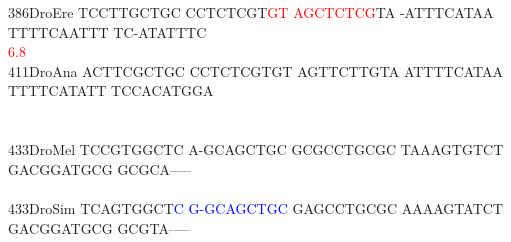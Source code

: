 \documentclass[11pt,twoside,reqno,a4paper]{article}
\begin{document}
{386\hspace*{1\charwidth}DroEre	TCCTTGCTGC	CCTCTCGT\textcolor{Red}{G}\textcolor{Red}{T}	\textcolor{Red}{A}\textcolor{Red}{G}\textcolor{Red}{C}\textcolor{Red}{T}\textcolor{Red}{C}\textcolor{Red}{T}\textcolor{Red}{C}\textcolor{Red}{G}TA	-ATTTCATAA	TTTTCAATTT	TC-ATATTTC	\\
\hspace*{4\charwidth}\hspace*{7\charwidth}\hspace*{1\charwidth}\hspace*{18\charwidth}\textcolor{Red}{6.8}\hspace*{1\charwidth}\hspace*{1\charwidth}\hspace*{1\charwidth}\hspace*{1\charwidth}\hspace*{1\charwidth}\\
411\hspace*{1\charwidth}DroAna	ACTTCGCTGC	CCTCTCGTGT	AGTTCTTGTA	ATTTTCATAA	TTTTCATATT	TCCACATGGA	\\
\hspace*{4\charwidth}\hspace*{7\charwidth}\hspace*{1\charwidth}\hspace*{1\charwidth}\hspace*{1\charwidth}\hspace*{1\charwidth}\hspace*{1\charwidth}\hspace*{1\charwidth}\\
\\
433\hspace*{1\charwidth}DroMel	TCCGTGGCTC	A-GCAGCTGC	GCGCCTGCGC	TAAAGTGTCT	GACGGATGCG	GCGCA-----	\\
\hspace*{4\charwidth}\hspace*{7\charwidth}\hspace*{1\charwidth}\hspace*{1\charwidth}\hspace*{1\charwidth}\hspace*{1\charwidth}\hspace*{1\charwidth}\hspace*{1\charwidth}\\
433\hspace*{1\charwidth}DroSim	TCAGTGGCT\textcolor{Blue}{C}	\textcolor{Blue}{G}\textcolor{Blue}{-}\textcolor{Blue}{G}\textcolor{Blue}{C}\textcolor{Blue}{A}\textcolor{Blue}{G}\textcolor{Blue}{C}\textcolor{Blue}{T}\textcolor{Blue}{G}\textcolor{Blue}{C}	GAGCCTGCGC	AAAAGTATCT	GACGGATGCG	GCGTA-----	\\
}
\end{document}
